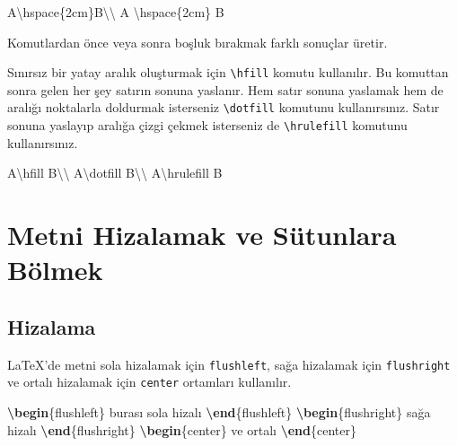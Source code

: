 \documentclass[
  10pt,
]{scrbook}
\newenvironment{Shaded}{}{}
\newcommand{\ExtensionTok}[1]{#1}
\newcommand{\FunctionTok}[1]{\textcolor[rgb]{0.02,0.16,0.49}{#1}}
\newcommand{\KeywordTok}[1]{\textcolor[rgb]{0.00,0.44,0.13}{\textbf{#1}}}
\newcommand{\NormalTok}[1]{#1}
\theoremstyle{definition}
\theoremstyle{definition}
\theoremstyle{definition}
\theoremstyle{definition}
\theoremstyle{remark}
\begin{document}
\begin{Shaded}
\begin{Highlighting}[]
\NormalTok{A}\FunctionTok{\textbackslash{}hspace}\NormalTok{\{2cm\}B}\FunctionTok{\textbackslash{}\textbackslash{}}
\NormalTok{A }\FunctionTok{\textbackslash{}hspace}\NormalTok{\{2cm\} B}
\end{Highlighting}
\end{Shaded}

Komutlardan önce veya sonra boşluk bırakmak farklı sonuçlar üretir.

Sınırsız bir yatay aralık oluşturmak için \texttt{\textbackslash{}hfill} komutu kullanılır. Bu komuttan sonra gelen her şey satırın sonuna yaslanır. Hem satır sonuna yaslamak hem de aralığı noktalarla doldurmak isterseniz \texttt{\textbackslash{}dotfill} komutunu kullanırsınız. Satır sonuna yaslayıp aralığa çizgi çekmek isterseniz de \texttt{\textbackslash{}hrulefill} komutunu kullanırsınız.

\begin{Shaded}
\begin{Highlighting}[]
\NormalTok{A}\FunctionTok{\textbackslash{}hfill}\NormalTok{ B}\FunctionTok{\textbackslash{}\textbackslash{}}
\NormalTok{A}\FunctionTok{\textbackslash{}dotfill}\NormalTok{ B}\FunctionTok{\textbackslash{}\textbackslash{}}
\NormalTok{A}\FunctionTok{\textbackslash{}hrulefill}\NormalTok{ B}
\end{Highlighting}
\end{Shaded}

\hypertarget{metni-hizalamak-ve-suxfctunlara-buxf6lmek}{%
\section{Metni Hizalamak ve Sütunlara Bölmek}\label{metni-hizalamak-ve-suxfctunlara-buxf6lmek}}

\hypertarget{hizalama}{%
\subsection{Hizalama}\label{hizalama}}

LaTeX'de metni sola hizalamak için \texttt{flushleft}, sağa hizalamak için \texttt{flushright} ve ortalı hizalamak için \texttt{center} ortamları kullanılır.

\begin{Shaded}
\begin{Highlighting}[]
\KeywordTok{\textbackslash{}begin}\NormalTok{\{}\ExtensionTok{flushleft}\NormalTok{\}}
\NormalTok{ burası sola hizalı}
\KeywordTok{\textbackslash{}end}\NormalTok{\{}\ExtensionTok{flushleft}\NormalTok{\}}
\KeywordTok{\textbackslash{}begin}\NormalTok{\{}\ExtensionTok{flushright}\NormalTok{\}}
\NormalTok{ sağa hizalı}
\KeywordTok{\textbackslash{}end}\NormalTok{\{}\ExtensionTok{flushright}\NormalTok{\}}
\KeywordTok{\textbackslash{}begin}\NormalTok{\{}\ExtensionTok{center}\NormalTok{\}}
\NormalTok{ ve ortalı}
\KeywordTok{\textbackslash{}end}\NormalTok{\{}\ExtensionTok{center}\NormalTok{\}}
\end{Highlighting}
\end{Shaded}
\end{document}
